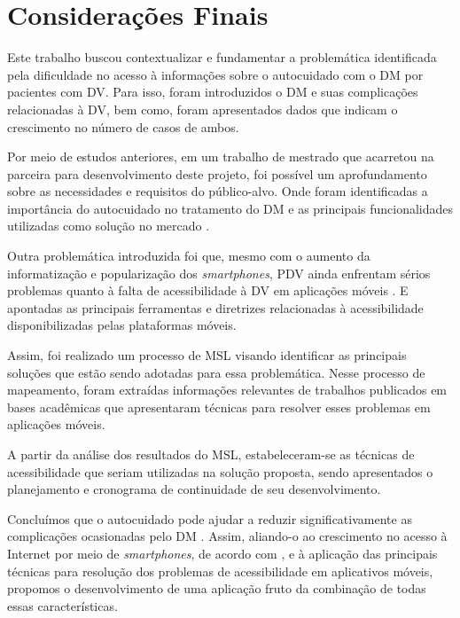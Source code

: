 \chapter{Considerações Finais}
\label{ch:conclusion}

Este trabalho buscou contextualizar e fundamentar a problemática identificada pela dificuldade
no acesso à informações sobre o autocuidado com o DM por pacientes com DV\@. Para isso, foram introduzidos
o DM e suas complicações relacionadas à DV, bem como, foram apresentados dados que indicam o crescimento no
número de casos de ambos.

Por meio de estudos anteriores, em um trabalho de mestrado que acarretou na parceira para desenvolvimento deste
projeto, foi possível um aprofundamento sobre as necessidades e requisitos do público-alvo.
Onde foram identificadas a importância do autocuidado no tratamento do DM e as principais funcionalidades utilizadas
como solução no mercado \cite{Sobral2021}.

Outra problemática introduzida foi que, mesmo com o aumento da informatização e popularização dos \emph{smartphones},
PDV ainda enfrentam sérios problemas quanto à falta de acessibilidade à DV em aplicações móveis \cite{Shera2021285}.
E apontadas as principais ferramentas e diretrizes relacionadas à acessibilidade disponibilizadas pelas plataformas móveis.

Assim, foi realizado um processo de MSL visando identificar as principais soluções que estão sendo adotadas
para essa problemática. Nesse processo de mapeamento, foram extraídas informações relevantes
de trabalhos publicados em bases acadêmicas que apresentaram técnicas para resolver esses problemas
em aplicações móveis.

A partir da análise dos resultados do MSL, estabeleceram-se as técnicas de acessibilidade que seriam utilizadas
na solução proposta, sendo apresentados o planejamento e cronograma de continuidade de seu desenvolvimento.

Concluímos que o autocuidado pode ajudar a reduzir significativamente as complicações ocasionadas pelo DM \cite{ADA2019}.
Assim, aliando-o ao crescimento no acesso à Internet por meio de \emph{smartphones}, de acordo com ,
e à aplicação das principais técnicas para resolução dos problemas de acessibilidade em aplicativos móveis, propomos o
desenvolvimento de uma aplicação fruto da combinação de todas essas características.